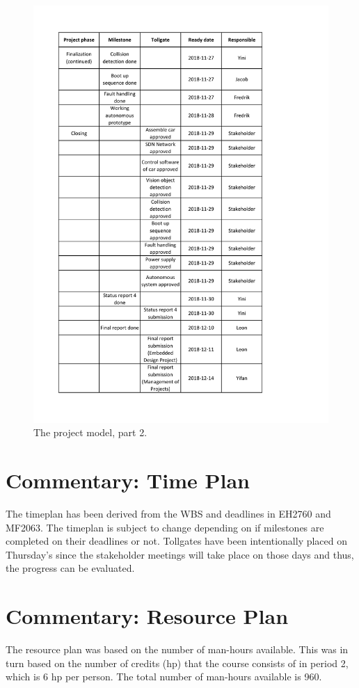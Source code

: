 \documentclass[11pt, titlepage]{article} %
\begin{document}
\begin{figure}
    \centering
    \includegraphics[scale=0.7]{project_model2.pdf}
    \caption{The project model, part 2.}
    \label{fig:project_model2}
\end{figure}




\section{Commentary: Time Plan}
The timeplan has been derived from the WBS and deadlines in EH2760 and MF2063. The timeplan is subject to change
depending on if milestones are completed on their deadlines or not. Tollgates have been intentionally placed on Thursday's
since the stakeholder meetings will take place on those days and thus, the progress can be evaluated.

\section{Commentary: Resource Plan}
The resource plan was based on the number of man-hours available. This was in turn based on the number of credits (hp) that
the course consists of in period 2, which is 6 hp per person. The total number of man-hours available is 960.
\end{document}
